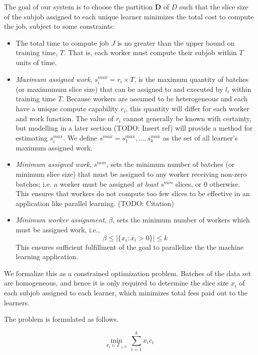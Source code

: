 \documentclass[../mthe-493-final-project.tex]{subfiles}
\begin{document}
    The goal of our system is to choose the partition $\boldsymbol{D}$ of $D$ such that the slice size of the subjob assigned to each unique learner minimizes the total cost to compute the job, subject to some constraints:

    \begin{itemize}
        \item The total time to compute job $J$ is no greater than the upper bound on training time, $T$. That is, each worker must compute their subjob within $T$ units of time.
        \item \textit{Maximum assigned work}, $s^{max}_i = r_i \times T$, is the maximum quantity of batches (or maximumum slice size) that can be assigned to and executed by $l_i$ within training time $T$. Because workers are assumed to be heterogeneous and each have a unique compute capability $r_i$, this quantity will differ for each worker and work function. The value of $r_i$ cannot generally be known with certainty, but modelling in a later section (TODO: Insert ref) will provide a method for estimating $s_i^{max}$. We define $s^{max} = {s_1^{max},...,s_k^{max}}$ as the set of all learner's maximum assigned work.
        \item \textit{Minimum assigned work}, $s^{min}$, sets the minimum number of batches (or minimum slice size) that must be assigned to any worker receiving non-zero batches; i.e. a worker must be assigned \textit{at least} $s^{min}$ slices, or 0 otherwise. This ensures that workers do not compute too few slices to be effective in an application like parallel learning. (TODO: Citation)
        \item \textit{Minimum worker assignment}, $\beta$, sets the minimum number of workers which must be assigned work, i.e.,
              \[\beta \leq \vert \{x_i : x_i > 0\} \vert \leq k\]
        This ensures sufficient fulfillment of the goal to parallelize the the machine learning application.
    \end{itemize}

    We formalize this as a constrained optimization problem. Batches of the data set are homogeneous, and hence it is only required to determine the slice size $x_i$ of each subjob assigned to each learner, which minimizes total fees paid out to the learners.
    
    The problem is formulated as follows.

    \begin{equation}
        \label{eq:optimization-objective-function}
        \min_{x_i \in \mathbb{Z}_{\geq 0}} \ \sum_{i=1}^k x_i c_i
    \end{equation}
\end{document}
